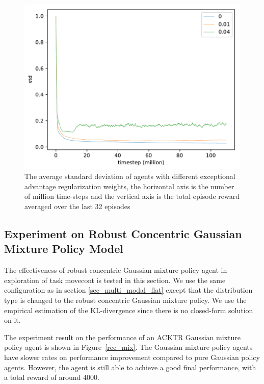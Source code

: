 \begin{figure}[!htbp]
	\includegraphics[width=\textwidth]{images/rec_180606_std_adv_reg.pdf}
	\centering
	\caption{The average standard deviation of agents with different exceptional advantage regularization weights, the horizontal axis is the number of million time-steps and the vertical axis is the total episode reward averaged over the last 32 episodes}\label{rec_std_adv_reg}
\end{figure}

\subsection{Experiment on Robust Concentric Gaussian Mixture Policy Model}
The effectiveness of robust concentric Gaussian mixture policy agent in exploration of task movecont is tested in this section. We use the same configuration as in section \ref{sec_multi_modal_flat} except that the distribution type is changed to the robust concentric Gaussian mixture policy. We use the empirical estimation of the KL-divergence since there is no closed-form solution on it.

The experiment result on the performance of an ACKTR Gaussian mixture policy agent is shown in Figure~\ref{rec_mix}. The Gaussian mixture policy agents have slower rates on performance improvement compared to pure Gaussian policy agents. However, the agent is still able to achieve a good final performance, with a total reward of around 4000.

